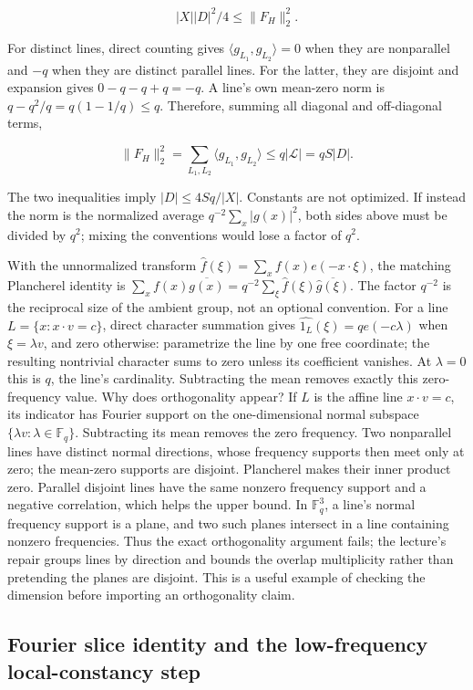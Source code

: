 \[|X||D|^2/4\le \|F_H\|_2^2.\]

For distinct lines, direct counting gives \(\langle g_{L_1},g_{L_2}\rangle=0\) when they are nonparallel and \(-q\) when they are distinct parallel lines. For the latter, they are disjoint and expansion gives \(0-q-q+q=-q\). A line's own mean-zero norm is \(q-q^2/q=q(1-1/q)\le q\). Therefore, summing all diagonal and off-diagonal terms,

\[\|F_H\|_2^2=\sum_{L_1,L_2}\langle g_{L_1},g_{L_2}\rangle\le q|\mathcal L|=qS|D|.\]

The two inequalities imply \(|D|\le 4Sq/|X|\). Constants are not optimized. If instead the norm is the normalized average \(q^{-2}\sum_x|g(x)|^2\), both sides above must be divided by \(q^2\); mixing the conventions would lose a factor of \(q^2\).

With the unnormalized transform \(\widehat f(\xi)=\sum_x f(x)e(-x\cdot\xi)\), the matching Plancherel identity is \(\sum_x f(x)\overline{g(x)}=q^{-2}\sum_\xi\widehat f(\xi)\overline{\widehat g(\xi)}\). The factor \(q^{-2}\) is the reciprocal size of the ambient group, not an optional convention. For a line \(L=\{x:x\cdot v=c\}\), direct character summation gives \(\widehat{1_L}(\xi)=q e(-c\lambda)\) when \(\xi=\lambda v\), and zero otherwise: parametrize the line by one free coordinate; the resulting nontrivial character sums to zero unless its coefficient vanishes. At \(\lambda=0\) this is \(q\), the line's cardinality. Subtracting the mean removes exactly this zero-frequency value. Why does orthogonality appear? If \(L\) is the affine line \(x\cdot v=c\), its indicator has Fourier support on the one-dimensional normal subspace \(\{\lambda v:\lambda\in\mathbb F_q\}\). Subtracting its mean removes the zero frequency. Two nonparallel lines have distinct normal directions, whose frequency supports then meet only at zero; the mean-zero supports are disjoint. Plancherel makes their inner product zero. Parallel disjoint lines have the same nonzero frequency support and a negative correlation, which helps the upper bound. In \(\mathbb F_q^3\), a line's normal frequency support is a plane, and two such planes intersect in a line containing nonzero frequencies. Thus the exact orthogonality argument fails; the lecture's repair groups lines by direction and bounds the overlap multiplicity rather than pretending the planes are disjoint. This is a useful example of checking the dimension before importing an orthogonality claim.

\subsection{Fourier slice identity and the low-frequency local-constancy step}\label{04-visual-computing-ii-ch032-fourier-slice-identity-and-the-low-frequency-local-constancy-step}

